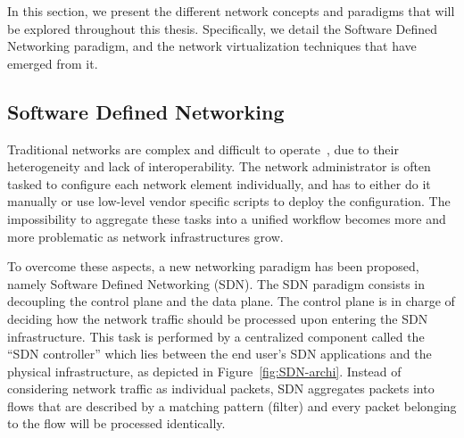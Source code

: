 In this section, we present the different network concepts and paradigms that will be explored throughout this thesis.
Specifically, we detail the Software Defined Networking paradigm, and the network virtualization techniques that have emerged from it.

\subsection{Software Defined Networking}

Traditional networks are complex and difficult to operate~\cite{complexnetworks}, due to their heterogeneity and lack of interoperability. The network administrator is often tasked to configure each network element individually, and has to either do it manually or use low-level vendor specific scripts to deploy the configuration. The impossibility to aggregate these tasks into a unified workflow becomes more and more problematic as network infrastructures grow.

To overcome these aspects, a new networking paradigm has been proposed, namely Software Defined Networking (SDN).
The SDN paradigm consists in decoupling the control plane and the data plane.
The control plane is in charge of deciding how the network traffic should be processed upon entering the SDN infrastructure.
This task is performed by a centralized component called the ``SDN controller'' which lies between the end user's SDN applications and the physical infrastructure, as depicted in Figure~\ref{fig:SDN-archi}. Instead of considering network traffic as individual packets, SDN aggregates packets into flows that are described by a matching pattern (filter) and every packet belonging to the flow will be processed identically. 



